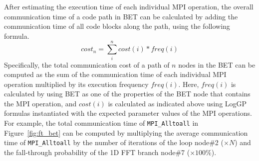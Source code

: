 After estimating the execution time of each individual MPI operation,
  the overall communication time of a code path in BET can be calculated by adding the communication time of all code blocks along the path, using the following formula.
\begin{equation}
  cost_{n} = \sum\limits_{i}^{n} cost(i) * freq(i)
\end{equation}
Specifically, the total communication cost of a path of $n$ nodes in the BET can be computed as the sum of
  the communication time of each individual MPI operation multiplied by its execution frequency $freq(i)$.
Here, $freq(i)$ is calculated by using BET as one of the properties of the BET node that contains the MPI operation,
and $cost(i)$ is calculated as indicated above using LogGP formulas instantiated with the expected parameter values of the MPI operations.
For example, the total communication time of \texttt{MPI\_Alltoall} in Figure~\ref{fig:ft_bet} can be computed by
  multiplying the average communication time of \texttt{MPI\_Alltoall} by the number of iterations of the loop node\#2 ($\times N$)
  and the fall-through probability of the 1D FFT branch node\#7 ($\times 100\%$).


